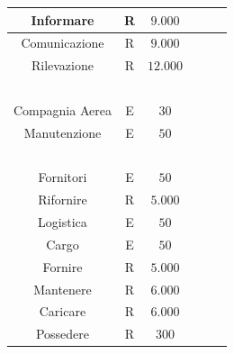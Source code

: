 \begin{tabular}{ | c  c  c | c  c  c | }
	\hline
	\textsf{\small Informare} & \textsf{\small R} & \textsf{\small $ 9.000 $} & \textsf{\small } & \textsf{\small } & \textsf{\small $ $}\\ %
	\hline
	\textsf{\small Comunicazione} & \textsf{\small R} & \textsf{\small $ 9.000 $} & \textsf{\small } & \textsf{\small } & \textsf{\small $ $}\\ %
	\hline
	\textsf{\small Rilevazione} & \textsf{\small R} & \textsf{\small $ 12.000 $} & \textsf{\small } & \textsf{\small } & \textsf{\small $ $}\\
	\hline
	\textsf{\small } & \textsf{\small } & \textsf{\small $ $} & \textsf{\small } & \textsf{\small } & \textsf{\small $ $}\\
	\hline
	\textsf{\small Compagnia Aerea} & \textsf{\small E} & \textsf{\small $ 30 $} & \textsf{\small } & \textsf{\small } & \textsf{\small $ $}\\
	\hline
	\textsf{\small Manutenzione} & \textsf{\small E} & \textsf{\small $ 50 $} & \textsf{\small } & \textsf{\small } & \textsf{\small $ $}\\
	\hline
	\textsf{\small } & \textsf{\small } & \textsf{\small $ $} & \textsf{\small } & \textsf{\small } & \textsf{\small $ $}\\
	\hline
	\textsf{\small Fornitori} & \textsf{\small E} & \textsf{\small $ 50 $} & \textsf{\small } & \textsf{\small } & \textsf{\small $ $}\\
	\hline
	\textsf{\small Rifornire} & \textsf{\small R} & \textsf{\small $ 5.000 $} & \textsf{\small } & \textsf{\small } & \textsf{\small $ $}\\
	\hline
	\textsf{\small Logistica} & \textsf{\small E} & \textsf{\small $ 50 $} & \textsf{\small } & \textsf{\small } & \textsf{\small $ $}\\
	\hline
	\textsf{\small Cargo} & \textsf{\small E} & \textsf{\small $ 50 $} & \textsf{\small } & \textsf{\small } & \textsf{\small $ $}\\
	\hline
	\textsf{\small Fornire} & \textsf{\small R} & \textsf{\small $ 5.000 $} & \textsf{\small } & \textsf{\small } & \textsf{\small $ $}\\
	\hline
	\textsf{\small Mantenere} & \textsf{\small R} & \textsf{\small $ 6.000 $} & \textsf{\small } & \textsf{\small } & \textsf{\small $ $}\\
	\hline
	\textsf{\small Caricare} & \textsf{\small R} & \textsf{\small $ 6.000 $} & \textsf{\small } & \textsf{\small } & \textsf{\small $ $}\\
	\hline
	\textsf{\small Possedere} & \textsf{\small R} & \textsf{\small $ 300 $} & \textsf{\small } & \textsf{\small } & \textsf{\small $ $}\\
	\hline
\end{tabular}

